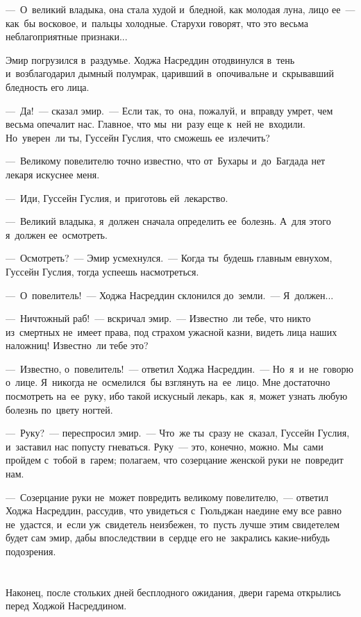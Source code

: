 \documentclass[12pt,a4paper]{book}
\begin{document}
—~О~великий владыка, она стала худой и~бледной, как молодая луна, лицо ее~— как~бы восковое, и~пальцы холодные. Старухи говорят, что это весьма неблагоприятные признаки...

Эмир погрузился в~раздумье. Ходжа Насреддин отодвинулся в~тень и~возблагодарил дымный полумрак, царивший в~опочивальне и~скрывавший бледность его лица.

—~Да!~— сказал эмир.~— Если так, то~она, пожалуй, и~вправду умрет, чем весьма опечалит нас. Главное, что мы~ни~разу еще к~ней не~входили. Но~уверен~ли ты, Гуссейн Гуслия, что сможешь ее~излечить?

—~Великому повелителю точно известно, что от~Бухары и~до~Багдада нет лекаря искуснее меня.

—~Иди, Гуссейн Гуслия, и~приготовь ей~лекарство.

—~Великий владыка, я~должен сначала определить ее~болезнь. А~для этого я~должен ее~осмотреть.

—~Осмотреть?~— Эмир усмехнулся.~— Когда ты~будешь главным евнухом, Гуссейн Гуслия, тогда успеешь насмотреться.

—~О~повелитель!~— Ходжа Насреддин склонился до~земли.~— Я~должен...

—~Ничтожный раб!~— вскричал эмир.~— Известно~ли тебе, что никто из~смертных не~имеет права, под страхом ужасной казни, видеть лица наших наложниц! Известно~ли тебе это?

—~Известно, о~повелитель!~— ответил Ходжа Насреддин.~— Но~я~и~не~говорю о~лице. Я~никогда не~осмелился~бы взглянуть на~ее~лицо. Мне достаточно посмотреть на~ее~руку, ибо такой искусный лекарь, как~я, может узнать любую болезнь по~цвету ногтей.

—~Руку?~— переспросил эмир.~— Что~же ты~сразу не~сказал, Гуссейн Гуслия, и~заставил нас попусту гневаться. Руку~— это, конечно, можно. Мы~сами пройдем с~тобой в~гарем; полагаем, что созерцание женской руки не~повредит нам.

—~Созерцание руки не~может повредить великому повелителю,~— ответил Ходжа Насреддин, рассудив, что увидеться с~Гюльджан наедине ему все равно не~удастся, и~если уж~свидетель неизбежен, то~пусть лучше этим свидетелем будет сам эмир, дабы впоследствии в~сердце его не~закрались какие-нибудь подозрения.


\chapter{}

Наконец, после стольких дней бесплодного ожидания, двери гарема открылись перед Ходжой Насреддином.
\end{document}
